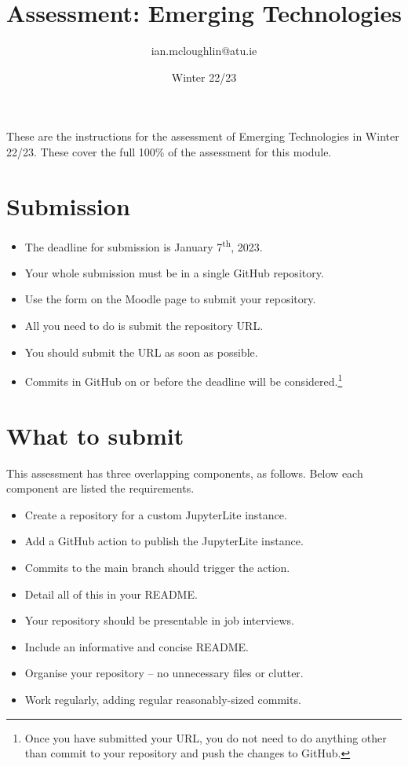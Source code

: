 \documentclass[a4paper]{tufte-handout}
\title{Assessment: Emerging Technologies}
\author{ian.mcloughlin@atu.ie}
\date{Winter 22/23}
\begin{document}
 
\maketitle

These are the instructions for the assessment of Emerging Technologies in Winter 22/23.
These cover the full 100\% of the assessment for this module.


\section{Submission}
\begin{itemize}
  \item The deadline for submission is January 7\textsuperscript{th}, 2023. 
  \item Your whole submission must be in a single GitHub repository.
  \item Use the form on the Moodle page to submit your repository.
  \item All you need to do is submit the repository URL.
  \item You should submit the URL as soon as possible.
  \item Commits in GitHub on or before the deadline will be considered.\footnote{Once you have submitted your URL, you do not need to do anything other than commit to your repository and push the changes to GitHub.}
\end{itemize}

\section{What to submit}
This assessment has three overlapping components, as follows.
Below each component are listed the requirements.

\begin{itemize}
  \item Create a repository for a custom JupyterLite instance.
  \item Add a GitHub action to publish the JupyterLite instance.
  \item Commits to the main branch should trigger the action.
  \item Detail all of this in your README.
\end{itemize}

\begin{itemize}
  \item Your repository should be presentable in job interviews.
  \item Include an informative and concise README.
  \item Organise your repository -- no unnecessary files or clutter.
  \item Work regularly, adding regular reasonably-sized commits.
\end{itemize}
\end{document}
